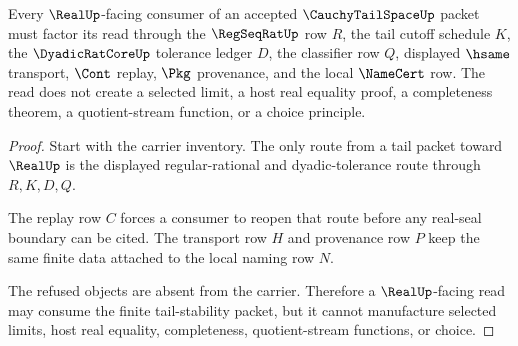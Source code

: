 \begin{theorem}
\label{thm:cauchy-tail-space-real-seal-nonescape}
Every $\RealUp$-facing consumer of an accepted $\CauchyTailSpaceUp$ packet must factor its read through the $\RegSeqRatUp$ row $R$, the tail cutoff schedule $K$, the $\DyadicRatCoreUp$ tolerance ledger $D$, the classifier row $Q$, displayed $\hsame$ transport, $\Cont$ replay, $\Pkg$ provenance, and the local $\NameCert$ row. The read does not create a selected limit, a host real equality proof, a completeness theorem, a quotient-stream function, or a choice principle.
\end{theorem}
\begin{proof}
Start with the carrier inventory. The only route from a tail packet toward $\RealUp$ is the displayed regular-rational and dyadic-tolerance route through $R,K,D,Q$.

The replay row $C$ forces a consumer to reopen that route before any real-seal boundary can be cited. The transport row $H$ and provenance row $P$ keep the same finite data attached to the local naming row $N$.

The refused objects are absent from the carrier. Therefore a $\RealUp$-facing read may consume the finite tail-stability packet, but it cannot manufacture selected limits, host real equality, completeness, quotient-stream functions, or choice.
\end{proof}

\begin{closurestatus}{\CauchyTailSpaceUp}
  \theoryclosure{\seedClosure}
  \formalstatus{\unformalizedV}
\end{closurestatus}
